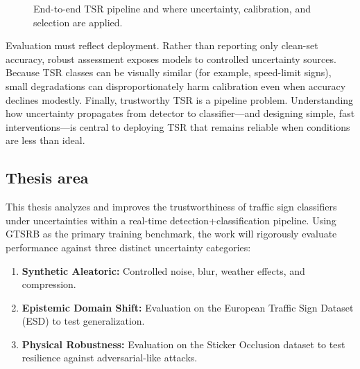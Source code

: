 \documentclass[11pt,a4paper]{article}
\begin{document}
\begin{figure}[!htbp]
  \centering
  \caption{End-to-end TSR pipeline and where uncertainty, calibration, and selection are applied.}
  \label{fig:tsr-pipeline}
\end{figure}

Evaluation must reflect deployment. Rather than reporting only clean-set accuracy, robust assessment exposes models to controlled uncertainty sources. Because TSR classes can be visually similar (for example, speed-limit signs), small degradations can disproportionately harm calibration even when accuracy declines modestly. Finally, trustworthy TSR is a pipeline problem. Understanding how uncertainty propagates from detector to classifier—and designing simple, fast interventions—is central to deploying TSR that remains reliable when conditions are less than ideal.

\subsection{Thesis area}

This thesis analyzes and improves the trustworthiness of traffic sign classifiers under uncertainties within a real-time detection+classification pipeline. Using GTSRB \cite{stallkamp2011gtsrb} as the primary training benchmark, the work will rigorously evaluate performance against three distinct uncertainty categories:
\begin{enumerate}
    \item \textbf{Synthetic Aleatoric:} Controlled noise, blur, weather effects, and compression.
    \item \textbf{Epistemic Domain Shift:} Evaluation on the European Traffic Sign Dataset (ESD) \cite{gamez2018esd} to test generalization.
    \item \textbf{Physical Robustness:} Evaluation on the Sticker Occlusion dataset \cite{bayzidi2022stickers} to test resilience against adversarial-like attacks.
\end{enumerate}
\end{document}
